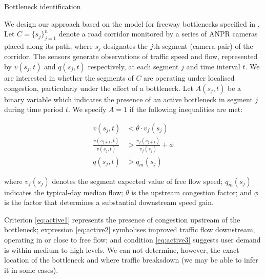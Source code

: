 \documentclass[final]{beamer}
\newlength{\colwidth}
\begin{document}
\begin{frame}[t]
\begin{columns}[t]
\begin{column}{\colwidth}
\begin{block}{Bottleneck identification }
    \vspace{-0.75cm}



    We design our approach based on the model for freeway bottlenecks specified
    in \cite{chen2004}.
    Let $C = \{ s_j \}_{j=1}^{n}$ denote a road corridor monitored by a series
    of ANPR cameras placed along its path, where $s_j$ designates the $j$th
    segment (camera-pair) of the corridor. The sensors generate
    observations of traffic speed and flow, represented by $v(s_j, t)$ and
    $q(s_j, t)$ respectively, at each segment $j$ and time interval $t$. We are
    interested in whether the segments of $C$ are operating under localised
    congestion, particularly under the effect of a bottleneck. Let $A(s_j,t)$
    be a binary variable which indicates the presence of an active bottleneck in
    segment $j$ during time period $t$. We specify $A=1$ if the following
    inequalities are met:

    \vspace{-0.25cm}

    \begin{align}
    v(s_j, t) &< \theta \cdot v_f(s_j) \label{eq:active1} \\[10pt]
    \frac{v(s_{j+1}, t)}{v(s_j, t)} &> \frac{v_f(s_{j+1})}{v_f(s_j)} + \phi \label{eq:active2} \\[10pt]
    q(s_j, t) &> q_m(s_j) \label{eq:active3}
    \end{align}

    where $v_f(s_j)$ denotes the segment expected value of free flow speed;
     $q_m(s_j)$ indicates the typical-day median flow; $\theta$ is the
    upstream congestion factor; and $\phi$ is the factor that determines a
    substantial downstream speed gain.

    Criterion \ref{eq:active1} represents the presence of congestion upstream
    of the bottleneck; expression \ref{eq:active2} symbolises improved traffic
    flow downstream, operating in or close to free flow; and condition
    \ref{eq:active3} suggests user demand is within medium to high levels.
    We can not determine, however, the exact location of the bottleneck and
    where traffic breaksdown (we may be able to infer it in some cases).

  \end{block}

\end{column}


\end{columns}
\end{frame}
\end{document}
